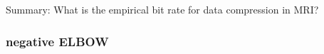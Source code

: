 \documentclass[
	11pt, %
	aspectratio=169, %
]{beamer}
\begin{document}
\begin{frame}[plain] %
	\begin{center}
		{\Huge Summary: What is the empirical bit rate for data compression in MRI?}
		
		\bigskip\bigskip %
		
	\end{center}
\end{frame}

 \begin{frame}
 \frametitle{negative ELBOW}
    \begin{figure}
        \begin{center}
        \end{center}
    \end{figure}
\end{frame}

\end{document}

